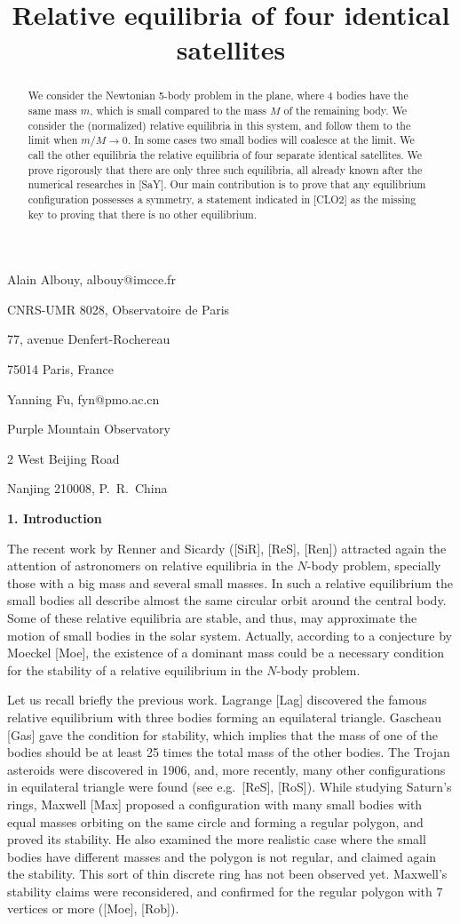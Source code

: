 \documentclass[11pt]{article}
\title{Relative equilibria of four identical satellites}
\date{}
\begin{document}
\maketitle

\centerline {Alain Albouy, albouy@imcce.fr}
\centerline {CNRS-UMR 8028, Observatoire de Paris}
\centerline {77, avenue Denfert-Rochereau}
\centerline {75014 Paris, France}
\bigskip
\centerline{Yanning Fu, fyn@pmo.ac.cn}
\centerline{Purple Mountain Observatory}
\centerline{2 West Beijing Road}
\centerline{Nanjing 210008, P.\ R.\ China}
\bigskip


\begin{abstract}
We consider the Newtonian 5-body problem in the plane, where 4 bodies have the same mass $m$, which is small compared to the mass $M$ of the remaining body. We consider the (normalized) relative equilibria in this system, and follow them to the limit when $m/M\to 0$. In some cases two small bodies will coalesce at the limit. We call the other equilibria the relative equilibria of four separate identical satellites. We prove rigorously that there are only three such equilibria, all already known after the numerical researches in [SaY]. Our main contribution is to prove that any equilibrium configuration possesses a symmetry, a statement indicated in [CLO2] as the missing key to proving that there is no other equilibrium.
\end{abstract}

\bigskip

\centerline{\bf 1. Introduction}

The recent  work by Renner and Sicardy ([SiR], [ReS], [Ren]) attracted
again the attention of astronomers on relative equilibria in the
$N$-body problem, specially those with a big mass and several small masses. In such a relative equilibrium the small bodies all describe almost the same circular
orbit around the central body. Some of these relative equilibria are
stable, and thus, may approximate the motion of small bodies in the
solar system. Actually, according to a conjecture by Moeckel [Moe],
the existence of a dominant mass could be a necessary condition for
the stability of a relative equilibrium in the $N$-body problem.

Let us recall briefly the previous work. Lagrange [Lag] discovered
the famous relative equilibrium with three bodies forming an
equilateral triangle. Gascheau [Gas] gave the condition for
stability, which implies that the mass of one of the bodies should
be at least 25 times the total mass of the other bodies. The Trojan
asteroids were discovered in 1906, and, more recently, many other
configurations in equilateral triangle were found (see e.g.\ [ReS], [RoS]).
While studying Saturn's rings, Maxwell [Max] proposed a
configuration with many small bodies with equal masses orbiting on
the same circle and forming a regular polygon, and proved its
stability. He also examined the more realistic case where the small
bodies have different masses and the polygon is not regular, and
claimed again the stability. This sort of thin discrete ring has not
been observed yet. Maxwell's stability claims were reconsidered, and
confirmed for the regular polygon with 7 vertices or more ([Moe],
[Rob]).
\end{document}
